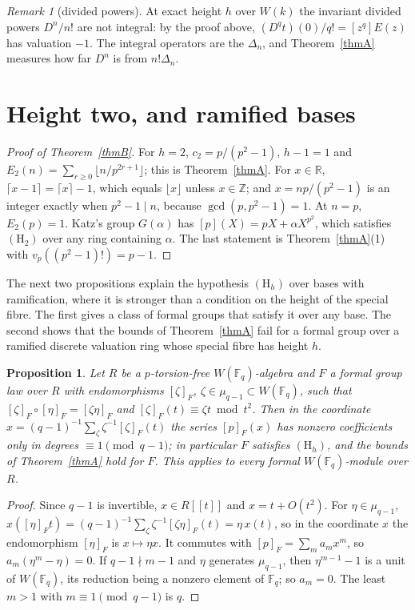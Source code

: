 \documentclass[11pt]{amsart}
\newtheorem{proposition}[thm]{Proposition}
\theoremstyle{definition}
\theoremstyle{remark}
\newtheorem{remark}[thm]{Remark}
\newcommand{\Z}{\mathbb Z}
\newcommand{\F}{\mathbb F}
\newcommand{\vp}{v_p}
\begin{document}
\begin{remark}[divided powers]
At exact height $h$ over $W(k)$ the invariant divided powers $D^n/n!$ are not integral: by the proof above, $(D^qt)(0)/q!=[z^q]E(z)$ has valuation $-1$. The integral operators are the $\Delta_n$, and Theorem~\ref{thmA} measures how far $D^n$ is from $n!\Delta_n$.
\end{remark}

\section{Height two, and ramified bases}\label{sec:ramified}

\begin{proof}[Proof of Theorem~\ref{thmB}]
For $h=2$, $c_2=p/(p^2-1)$, $h-1=1$ and $E_2(n)=\sum_{r\ge0}\lfloor n/p^{2r+1}\rfloor$; this is Theorem~\ref{thmA}. For $x\in\mathbb R$, $\lceil x-1\rceil=\lceil x\rceil-1$, which equals $\lfloor x\rfloor$ unless $x\in\Z$; and $x=np/(p^2-1)$ is an integer exactly when $p^2-1\mid n$, because $\gcd(p,p^2-1)=1$. At $n=p$, $E_2(p)=1$. Katz's group $G(\alpha)$ has $[p](X)=pX+\alpha X^{p^2}$, which satisfies $(\mathrm H_2)$ over any ring containing $\alpha$. The last statement is Theorem~\ref{thmA}(1) with $\vp((p^2-1)!)=p-1$.
\end{proof}

The next two propositions explain the hypothesis $(\mathrm H_h)$ over bases with ramification, where it is stronger than a condition on the height of the special fibre. The first gives a class of formal groups that satisfy it over any base. The second shows that the bounds of Theorem~\ref{thmA} fail for a formal group over a ramified discrete valuation ring whose special fibre has height $h$.

\begin{proposition}\label{prop:teich}
Let $R$ be a $p$-torsion-free $W(\F_q)$-algebra and $F$ a formal group law over $R$ with endomorphisms $[\zeta]_F$, $\zeta\in\mu_{q-1}\subset W(\F_q)$, such that $[\zeta]_F\circ[\eta]_F=[\zeta\eta]_F$ and $[\zeta]_F(t)\equiv\zeta t\bmod t^2$. Then in the coordinate $x=(q-1)^{-1}\sum_{\zeta}\zeta^{-1}[\zeta]_F(t)$ the series $[p]_F(x)$ has nonzero coefficients only in degrees $\equiv1\pmod{q-1}$; in particular $F$ satisfies $(\mathrm H_h)$, and the bounds of Theorem~\ref{thmA} hold for $F$. This applies to every formal $W(\F_q)$-module over $R$.
\end{proposition}

\begin{proof}
Since $q-1$ is invertible, $x\in R[[t]]$ and $x=t+O(t^2)$. For $\eta\in\mu_{q-1}$, $x([\eta]_Ft)=(q-1)^{-1}\sum_\zeta\zeta^{-1}[\zeta\eta]_F(t)=\eta\,x(t)$, so in the coordinate $x$ the endomorphism $[\eta]_F$ is $x\mapsto\eta x$. It commutes with $[p]_F=\sum_ma_mx^m$, so $a_m(\eta^m-\eta)=0$. If $q-1\nmid m-1$ and $\eta$ generates $\mu_{q-1}$, then $\eta^{m-1}-1$ is a unit of $W(\F_q)$, its reduction being a nonzero element of $\F_q$; so $a_m=0$. The least $m>1$ with $m\equiv1\pmod{q-1}$ is $q$.
\end{proof}
\end{document}
